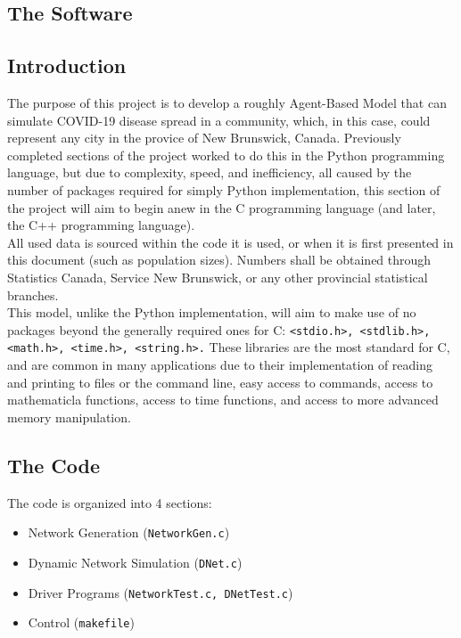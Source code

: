 \documentclass{article}
\numberwithin{equation}{section} %
\theoremstyle{definition}
\begin{document}
\begin{multicols*}{2}
\section{The Software}
\subsection{Introduction}

The purpose of this project is to develop a roughly Agent-Based Model that can simulate COVID-19 disease spread in a community, which, in this case, could represent any city in the provice of New Brunswick, Canada. Previously completed sections of the project worked to do this in the Python programming language, but due to complexity, speed, and inefficiency, all caused by the number of packages required for simply Python implementation, this section of the project will aim to begin anew in the C programming language (and later, the C++ programming language). \\

All used data is sourced within the code it is used, or when it is first presented in this document (such as population sizes). Numbers shall be obtained through Statistics Canada, Service New Brunswick, or any other provincial statistical branches. \\

This model, unlike the Python implementation, will aim to make use of no packages beyond the generally required ones for C: \lstinline{<stdio.h>, <stdlib.h>, <math.h>, <time.h>, <string.h>.} These libraries are the most standard for C, and are common in many applications due to their implementation of reading and printing to files or the command line, easy access to commands, access to mathematicla functions, access to time functions, and access to more advanced memory manipulation. \\

\subsection{The Code}
The code is organized into 4 sections:
\begin{itemize}
\item Network Generation (\lstinline{NetworkGen.c})
\item Dynamic Network Simulation (\lstinline{DNet.c})
\item Driver Programs (\lstinline{NetworkTest.c, DNetTest.c})
\item Control (\lstinline{makefile})
\end{itemize}


\end{multicols*}
\end{document}
